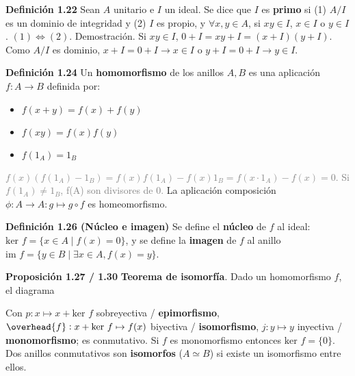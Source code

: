 \documentclass[a4paper, 11pt]{extarticle}
\newcommand{\propo}[1]{\textcolor{rojo}{\textbf{Proposición #1}}}
\newcommand{\defi}[1]{\textcolor{azul}{\textbf{Definición #1}}}
\newcommand{\dem}[1]{\textcolor{gris}{\small{Demostración. #1}}}
\begin{document}
\begin{multicols*}{2}
\defi{1.22} Sean \(A\) unitario e \(I\) un ideal. Se dice que \(I\) es
\textbf{primo} si (1) \(A/I\) es un dominio de integridad y (2) \(I\) es propio, y
\(\forall x,y \in A\), si \(xy \in I\), \(x \in I\) o \(y \in I\). \((1) \iff (2)\).
\dem{ Si \( xy \in I  \), \( 0 + I = xy + I = (x+I)(y+I) \). Como \( A/I  \) es dominio, 
\( x+I = 0 + I \rightarrow x \in I \) o \( y+I = 0 + I \rightarrow y \in I  \).  }

\defi{1.24} Un \textbf{homomorfismo} de los anillos \(A,B\) es una aplicación \(f: A
\rightarrow B\) definida por: \vspace{-1em}
\begin{itemize}
\item \(f(x+y) = f(x) + f(y)\)
\item \(f(xy) = f(x)f(y)\)
\item \(f(1_A) = 1_B\)
\end{itemize}
\vspace{-1em}\textcolor{gray}{\footnotesize \( f(x) (f(1_A) - 1_B) = f(x)f(1_A) - f(x)1_B = f(x\cdot 1_A) - f(x) = 0 \). 
Si \( f(1_A) \neq 1_B \), f(A) son divisores de 0.}
La aplicación composición \(\phi: A \rightarrow A: g \mapsto g \circ f\) es
homeomorfismo. 

\defi{1.26 (Núcleo e imagen)} Se define el \textbf{núcleo} de \(f\) al ideal: \(\text{ker } f
= \{ x \in A \;|\; f(x) = 0 \}\), y se define la \textbf{imagen} de \(f\) al anillo \(\text{im } f = \{ y \in B \;|\; \exists x \in A, f(x) = y \}\).

\propo{1.27 / 1.30} \textbf{Teorema de isomorfía}. Dado un homomorfismo \(f\), el diagrama

\vspace{-1em}
\begin{center}
\end{center}
\vspace{-1em}
Con \(p: x \mapsto x + \text{ker }f\) sobreyectiva / \textbf{epimorfismo}, \(\overhead{f}: x +
\text{ker }f \mapsto f(x)\) biyectiva / \textbf{isomorfismo}, \(j: y \mapsto y\)
inyectiva / \textbf{monomorfismo}; es
conmutativo.  
Si \(f\) es monomorfismo entonces \(\text{ker }f = \{ 0 \}\). Dos anillos
conmutativos son \textbf{isomorfos} (\(A \simeq B\)) si existe un isomorfismo entre
ellos.
\vspace{-1.5em}

\end{multicols*}
\end{document}
